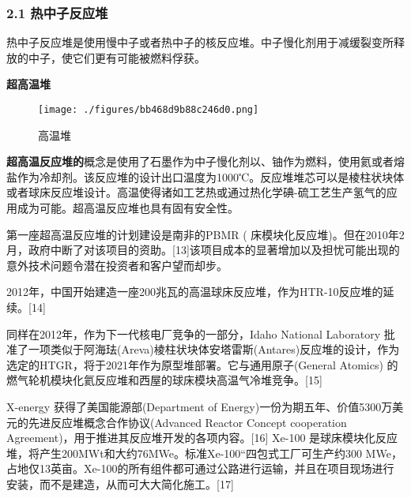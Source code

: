 \subsubsection{2.1 热中子反应堆}
热中子反应堆是使用慢中子或者热中子的核反应堆。中子慢化剂用于减缓裂变所释放的中子，使它们更有可能被燃料俘获。

\textbf{超高温堆}

\begin{figure}[ht]
\centering
\texttt{[image: ./figures/bb468d9b88c246d0.png]}
\caption{高温堆} \label{fig_FYD_1}
\end{figure}

\textbf{超高温反应堆的}概念是使用了石墨作为中子慢化剂以、铀作为燃料，使用氦或者熔盐作为冷却剂。该反应堆的设计出口温度为1000℃。反应堆堆芯可以是棱柱状块体或者球床反应堆设计。高温使得诸如工艺热或通过热化学碘-硫工艺生产氢气的应用成为可能。超高温反应堆也具有固有安全性。

第一座超高温反应堆的计划建设是南非的PBMR ( 床模块化反应堆)。但在2010年2月，政府中断了对该项目的资助。[13]该项目成本的显著增加以及担忧可能出现的意外技术问题令潜在投资者和客户望而却步。

2012年，中国开始建造一座200兆瓦的高温球床反应堆，作为HTR-10反应堆的延续。[14]

同样在2012年，作为下一代核电厂竞争的一部分，Idaho National Laboratory 批准了一项类似于阿海珐(Areva)棱柱状块体安塔雷斯(Antares)反应堆的设计，作为选定的HTGR，将于2021年作为原型堆部署。它与通用原子(General Atomics) 的燃气轮机模块化氦反应堆和西屋的球床模块高温气冷堆竞争。[15]

X-energy 获得了美国能源部(Department of Energy)一份为期五年、价值5300万美元的先进反应堆概念合作协议(Advanced Reactor Concept cooperation Agreement)，用于推进其反应堆开发的各项内容。[16] Xe-100 是球床模块化反应堆，将产生200MWt和大约76MWe。标准Xe-100“四包式工厂可生产约300 MWe，占地仅13英亩。Xe-100的所有组件都可通过公路进行运输，并且在项目现场进行安装，而不是建造，从而可大大简化施工。[17]